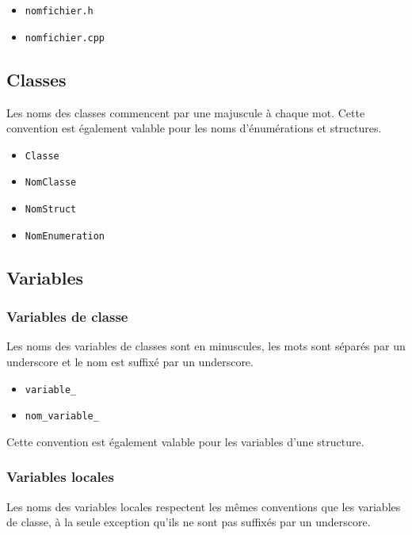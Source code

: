 \documentclass[]{article}
\begin{document}
\begin{itemize}
	\item \texttt{nomfichier.h}
	\item \texttt{nomfichier.cpp}
\end{itemize}

\subsection{Classes}

Les noms des classes commencent par une majuscule à chaque mot.
Cette convention est également valable pour les noms 
d'énumérations et structures.

\begin{itemize}
	\item \texttt{Classe}
	\item \texttt{NomClasse}
	\item \texttt{NomStruct}
	\item \texttt{NomEnumeration}
\end{itemize}

\newpage

\subsection{Variables}

\subsubsection{Variables de classe}

Les noms des variables de classes sont en minuscules, les mots sont 
séparés par un underscore et le nom est suffixé par un underscore.

\begin{itemize}
	\item \texttt{variable\_}
	\item \texttt{nom\_variable\_}
\end{itemize}

Cette convention est également valable pour les variables d'une
structure.

\subsubsection{Variables locales}

Les noms des variables locales respectent les mêmes conventions 
que les variables de classe, à la seule exception qu’ils ne sont pas
suffixés par un underscore.
\end{document}
